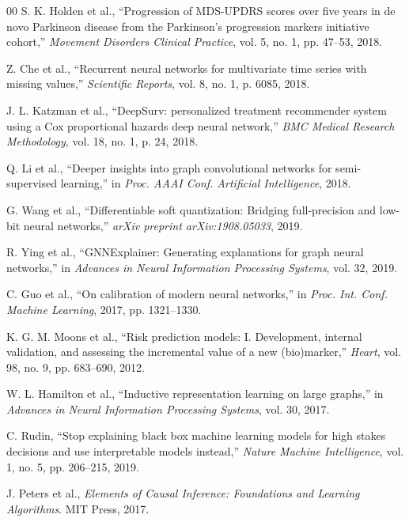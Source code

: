 \documentclass[journal,twoside,web]{ieeecolor}
\begin{document}
\begin{thebibliography}{00}
S. K. Holden et al., ``Progression of MDS-UPDRS scores over five years in de novo Parkinson disease from the Parkinson's progression markers initiative cohort,'' \textit{Movement Disorders Clinical Practice}, vol. 5, no. 1, pp. 47--53, 2018.

Z. Che et al., ``Recurrent neural networks for multivariate time series with missing values,'' \textit{Scientific Reports}, vol. 8, no. 1, p. 6085, 2018.

J. L. Katzman et al., ``DeepSurv: personalized treatment recommender system using a Cox proportional hazards deep neural network,'' \textit{BMC Medical Research Methodology}, vol. 18, no. 1, p. 24, 2018.

Q. Li et al., ``Deeper insights into graph convolutional networks for semi-supervised learning,'' in \textit{Proc. AAAI Conf. Artificial Intelligence}, 2018.

G. Wang et al., ``Differentiable soft quantization: Bridging full-precision and low-bit neural networks,'' \textit{arXiv preprint arXiv:1908.05033}, 2019.

R. Ying et al., ``GNNExplainer: Generating explanations for graph neural networks,'' in \textit{Advances in Neural Information Processing Systems}, vol. 32, 2019.

C. Guo et al., ``On calibration of modern neural networks,'' in \textit{Proc. Int. Conf. Machine Learning}, 2017, pp. 1321--1330.

K. G. M. Moons et al., ``Risk prediction models: I. Development, internal validation, and assessing the incremental value of a new (bio)marker,'' \textit{Heart}, vol. 98, no. 9, pp. 683--690, 2012.

W. L. Hamilton et al., ``Inductive representation learning on large graphs,'' in \textit{Advances in Neural Information Processing Systems}, vol. 30, 2017.

C. Rudin, ``Stop explaining black box machine learning models for high stakes decisions and use interpretable models instead,'' \textit{Nature Machine Intelligence}, vol. 1, no. 5, pp. 206--215, 2019.

J. Peters et al., \textit{Elements of Causal Inference: Foundations and Learning Algorithms}. MIT Press, 2017.


\end{thebibliography}
\end{document}
